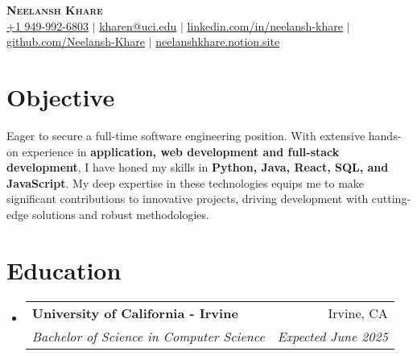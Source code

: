 \documentclass[letterpaper,11pt]{article}
\makeatletter
\newcommand{\resumeSubheading}[4]{
  \vspace{-2pt}\item
    \begin{tabular*}{0.97\textwidth}[t]{l@{\extracolsep{\fill}}r}
      \textbf{#1} & #2 \\
      \textit{\small#3} & \textit{\small #4} \\
    \end{tabular*}\vspace{-7pt}
}
\newcommand{\resumeSubHeadingListStart}{\begin{itemize}[leftmargin=0.15in, label={}]}
\newcommand{\resumeSubHeadingListEnd}{\end{itemize}}
\makeatother
\begin{document}
\begin{center}  
    \textbf{\Huge \scshape Neelansh Khare} \\ \vspace{1pt}
    \color{blue}
    \small \href{tel:19499926803}{{+1 949-992-6803}} $|$ \href{mailto:kharen@uci.edu}{{kharen@uci.edu}} $|$ 
    \href{https://linkedin.com/in/neelansh-khare}{{linkedin.com/in/neelansh-khare}} $|$
    \href{https://github.com/Neelansh-Khare}{{github.com/Neelansh-Khare}} $|$
    \href{http://neelanshkhare.notion.site}{{neelanshkhare.notion.site}} 
\end{center}

\section{Objective}
\begin{itemize}[leftmargin=0.15in, label={}]
  \small{\item{
   \textbf{}{Eager to secure a full-time software engineering position. With extensive hands-on experience in \textbf{application, web development and full-stack development}, I have honed my skills in \textbf{Python, Java, React, SQL, and JavaScript}. My deep expertise in these technologies equips me to make significant contributions to innovative projects, driving development with cutting-edge solutions and robust methodologies.} \\
  }}
  \end{itemize}


\section{Education}
  \resumeSubHeadingListStart
    \resumeSubheading
      {University of California - Irvine}{Irvine, CA}
      {Bachelor of Science in Computer Science}{Expected June 2025}
  \resumeSubHeadingListEnd
  
\end{document}
